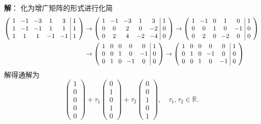 {\bf 解}： 化为增广矩阵的形式进行化简
\begin{align*}
\arraycolsep=4pt
\left( \begin{array}{ccccc|c} 1 & -1 & -3 & 1 & 3 & 1 \\ 1 & -1 & -1 & 1 & 1 & 1 \\ 1 & 1 & 1 & -1 & -1 & 1 \end{array} \right) & \rightarrow
\arraycolsep=4pt
\left( \begin{array}{ccccc|c} 1 & -1 & -3 & 1 & 3 & 1 \\ 0 & 0 & 2 & 0 & -2 & 0 \\ 0 & 2 & 4 & -2 & -4 & 0 \end{array} \right) \rightarrow
\arraycolsep=4pt
\left( \begin{array}{ccccc|c} 1 & -1 & 0 & 1 & 0 & 1 \\ 0 & 0 & 1 & 0 & -1 & 0 \\ 0 & 2 & 0 & -2 & 0 & 0 \end{array} \right) \\
& \rightarrow
\arraycolsep=4pt
\left( \begin{array}{ccccc|c} 1 & 0 & 0 & 0 & 0 & 1 \\ 0 & 0 & 1 & 0 & -1 & 0 \\ 0 & 1 & 0 & -1 & 0 & 0 \end{array} \right) \rightarrow
\arraycolsep=4pt
\left( \begin{array}{ccccc|c} 1 & 0 & 0 & 0 & 0 & 1 \\ 0 & 1 & 0 & -1 & 0 & 0 \\ 0 & 0 & 1 & 0 & -1 & 0 \end{array} \right)
\end{align*}
解得通解为
$$\begin{pmatrix} 1 \\ 0 \\ 0 \\ 0 \\ 0 \end{pmatrix} + \tau_1 \begin{pmatrix} 0 \\ 1 \\ 0 \\ 1 \\ 0 \end{pmatrix} + \tau_2 \begin{pmatrix} 0 \\ 0 \\ 1 \\ 0 \\ 1 \end{pmatrix}, \quad \tau_1, \tau_2 \in \mathbb{R}.$$


